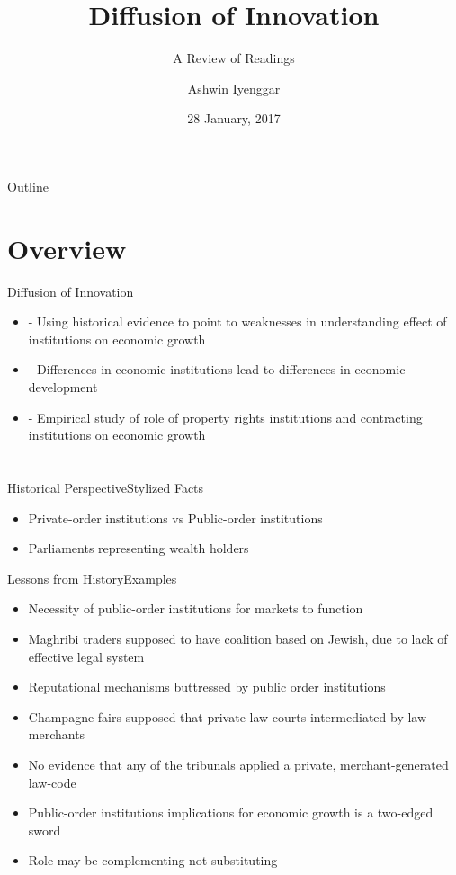 \documentclass{beamer}
\title{Diffusion of Innovation}
\subtitle{A Review of Readings}
\author{Ashwin Iyenggar}
\institute[Indian Institute of Management Bangalore] 
{
  Corporate Strategy and Policy\\
  Indian Institute of Management Bangalore
}
\date{28 January, 2017}
\begin{document}
\begin{frame}
  \titlepage
\end{frame}

\begin{frame}{Outline}
  \tableofcontents
\end{frame}

\section{Overview}
\begin{frame}{Diffusion of Innovation}{}
\begin{itemize}
\item{\cite{Ogilvie2014}} - Using historical evidence to point to weaknesses in understanding effect of institutions on economic growth
\item{\cite{Acemoglu2005}} - Differences in economic institutions lead to differences in economic development
\item{\cite{Acemoglu2003}} - Empirical study of role of property rights institutions and contracting institutions on economic growth
\end{itemize}
\end{frame}

\section{\cite{Ogilvie2014}}
\begin{frame}{Historical Perspective}{Stylized Facts}
\begin{itemize}
\item{Private-order institutions vs Public-order institutions}
\item{Parliaments representing wealth holders}
\end{itemize}
\end{frame}

\begin{frame}{Lessons from History}{Examples}
\begin{itemize}
\item{Necessity of public-order institutions for markets to function}
\item{Maghribi traders supposed to have coalition based on Jewish, due to lack of effective legal system}
\item{Reputational mechanisms buttressed by public order institutions}
\item{Champagne fairs supposed that  private law-courts intermediated by law merchants}
\item{No evidence that any of the tribunals applied a private, merchant-generated law-code}
\item{Public-order institutions implications for economic growth is a two-edged sword}
\item{Role may be complementing not substituting}
\end{itemize}
\end{frame}
\end{document}
